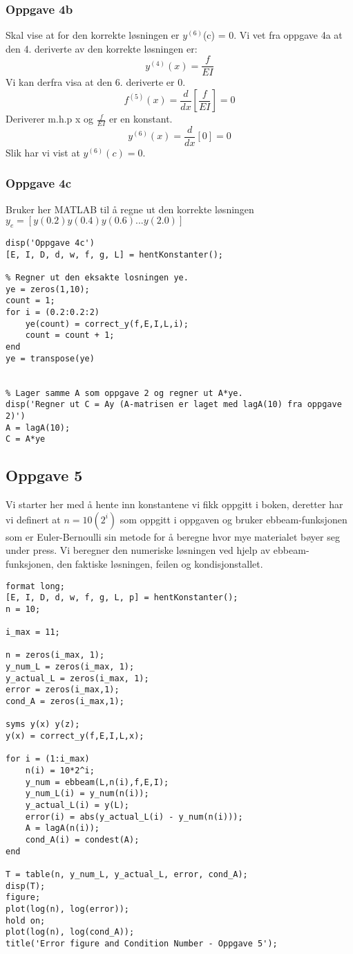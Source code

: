 \subsubsection{Oppgave 4b}
Skal vise at for den korrekte løsningen er $y^{(6)}$(c) = 0. Vi vet fra oppgave 4a at den 4. deriverte av den korrekte løsningen er:
\begin{equation*}
y^{(4)}(x) = \frac{f}{EI}
\end{equation*}
Vi kan derfra visa at den 6. deriverte er 0.
\begin{equation}
f^{(5)}(x) = \frac{d}{dx}[\frac{f}{EI}] = 0
\end{equation}
Deriverer m.h.p x og $\frac{f}{EI}$ er en konstant.
\begin{equation}
y^{(6)}(x) = \frac{d}{dx}[0] = 0
\end{equation}
Slik har vi vist at $y^{(6)}(c) = 0$.

\subsubsection{Oppgave 4c}
Bruker her MATLAB til å regne ut den korrekte løsningen $y_e = [y(0.2) y(0.4) y(0.6) ... y(2.0)]$ 
\begin{lstlisting}
disp('Oppgave 4c')
[E, I, D, d, w, f, g, L] = hentKonstanter();

% Regner ut den eksakte losningen ye.
ye = zeros(1,10);
count = 1;
for i = (0.2:0.2:2)
    ye(count) = correct_y(f,E,I,L,i);
    count = count + 1;
end
ye = transpose(ye)


% Lager samme A som oppgave 2 og regner ut A*ye.
disp('Regner ut C = Ay (A-matrisen er laget med lagA(10) fra oppgave 2)')
A = lagA(10);
C = A*ye
\end{lstlisting}
\subsection{Oppgave 5}
Vi starter her med å hente inn konstantene vi fikk oppgitt i boken, deretter har vi definert at $n=10(2^{i})$ som oppgitt i oppgaven og bruker ebbeam-funksjonen som er 
Euler-Bernoulli sin metode for å beregne hvor mye materialet bøyer seg under press. 
Vi beregner den numeriske løsningen ved hjelp av ebbeam-funksjonen, den faktiske løsningen, feilen og kondisjonstallet. 
\begin{lstlisting}
format long;
[E, I, D, d, w, f, g, L, p] = hentKonstanter();
n = 10;

i_max = 11;

n = zeros(i_max, 1);
y_num_L = zeros(i_max, 1);
y_actual_L = zeros(i_max, 1);
error = zeros(i_max,1);
cond_A = zeros(i_max,1);

syms y(x) y(z);
y(x) = correct_y(f,E,I,L,x);

for i = (1:i_max)
    n(i) = 10*2^i;
    y_num = ebbeam(L,n(i),f,E,I);
    y_num_L(i) = y_num(n(i));
    y_actual_L(i) = y(L);
    error(i) = abs(y_actual_L(i) - y_num(n(i)));
    A = lagA(n(i));
    cond_A(i) = condest(A);
end

T = table(n, y_num_L, y_actual_L, error, cond_A);
disp(T);
figure;
plot(log(n), log(error));
hold on;
plot(log(n), log(cond_A));
title('Error figure and Condition Number - Oppgave 5');
\end{lstlisting}

